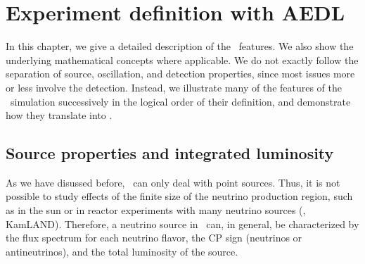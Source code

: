 \chapter{Experiment definition with AEDL}

In this chapter, we give a detailed description of the \AEDL\ features. We also show the underlying mathematical concepts where applicable. We do not exactly follow the separation of source, oscillation, and detection properties, since most issues more or less involve the detection. Instead,
we illustrate many of the features of the \GLOBES\ simulation successively
in the logical order of their definition, and demonstrate how they translate into \AEDL .

\section{Source properties and integrated luminosity}
\label{sec:source}

As we have disussed before, \GLOBES\ can only deal with point sources. Thus,  it is not possible to study effects of the finite size of the neutrino production region, such as in the sun or in reactor experiments with many
neutrino sources (\eg, KamLAND). Therefore, a neutrino source in \GLOBES\ can, in general, be characterized by the flux spectrum for each neutrino flavor, the CP sign (neutrinos or antineutrinos), and the total luminosity
of the source.

